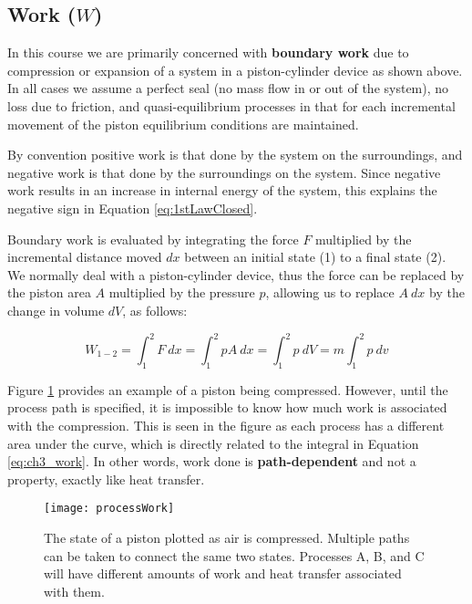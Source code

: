 \subsection{Work ($W$)}


In this course we are primarily concerned with {\bf boundary work} due to compression or expansion of a system in a piston-cylinder device as shown above. In all cases we assume a perfect seal (no mass flow in or out of the system), no loss due to friction, and quasi-equilibrium processes in that for each incremental movement of the piston equilibrium conditions are maintained.

By convention positive work is that done by the system on the surroundings, and negative work is that done by the surroundings on the system.  Since negative work results in an increase in internal energy of the system, this explains the negative sign in Equation \ref{eq:1stLawClosed}.

Boundary work is evaluated by integrating the force $F$ multiplied by the incremental distance moved $dx$ between an initial state (1) to a final state (2). We normally deal with a piston-cylinder device, thus the force can be replaced by the piston area $A$ multiplied by the pressure $p$, allowing us to replace $A\:dx$ by the change in volume $dV$, as follows:

\begin{equation} \label{eq:ch3_work}
  W_{1-2}=\int_1^2F\:dx=\int_1^2pA\:dx=\int_1^2p\:dV=m\int_1^2 p\:dv
\end{equation}

Figure \ref{fig:ch3_pV} provides an example of a piston being compressed.  However, until the process path is specified, it is impossible to know how much work is associated with the compression.  This is seen in the figure as each process has a different area under the curve, which is directly related to the integral in Equation \ref{eq:ch3_work}.  In other words, work done is {\bf path-dependent} and not a property, exactly like heat transfer.

\begin{figure}[H]
\centering
\texttt{[image: processWork]}
\caption{The state of a piston plotted as air is compressed.  Multiple paths can be taken to connect the same two states.  Processes A, B, and C will have different amounts of work and heat transfer associated with them.}
\label{fig:ch3_pV}
\end{figure}

